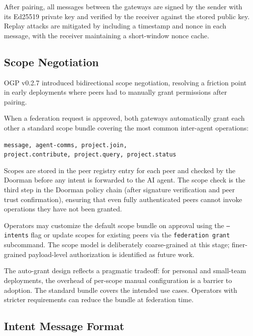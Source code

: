 \documentclass[conference]{IEEEtran}
\begin{document}
After pairing, all messages between the gateways are signed by the sender with its Ed25519 private key and verified by the receiver against the stored public key. Replay attacks are mitigated by including a timestamp and nonce in each message, with the receiver maintaining a short-window nonce cache.

\subsection{Scope Negotiation}
\label{sec:scopes}

OGP v0.2.7 introduced bidirectional scope negotiation, resolving a friction point in early deployments where peers had to manually grant permissions after pairing.

When a federation request is approved, both gateways automatically grant each other a standard scope bundle covering the most common inter-agent operations:

\begin{center}
\texttt{message, agent-comms, project.join,} \\
\texttt{project.contribute, project.query, project.status}
\end{center}

Scopes are stored in the peer registry entry for each peer and checked by the Doorman before any intent is forwarded to the AI agent. The scope check is the third step in the Doorman policy chain (after signature verification and peer trust confirmation), ensuring that even fully authenticated peers cannot invoke operations they have not been granted.

Operators may customize the default scope bundle on approval using the \texttt{--intents} flag or update scopes for existing peers via the \texttt{federation grant} subcommand. The scope model is deliberately coarse-grained at this stage; finer-grained payload-level authorization is identified as future work.

The auto-grant design reflects a pragmatic tradeoff: for personal and small-team deployments, the overhead of per-scope manual configuration is a barrier to adoption. The standard bundle covers the intended use cases. Operators with stricter requirements can reduce the bundle at federation time.

\subsection{Intent Message Format}
\end{document}
